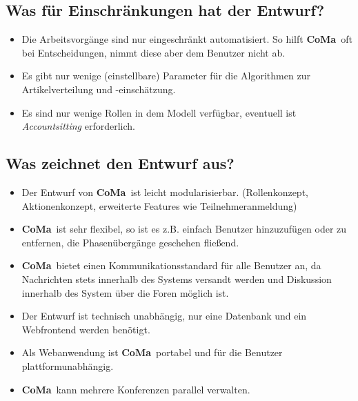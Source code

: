 \documentclass[headexclude,footexclude,12pt,BCOR0pt,DIV15]{scrartcl}
\newcommand{\CoMa}{\textbf{CoMa}}
\begin{document}
    \subsection{Was f\"{u}r Einschr\"{a}nkungen hat der Entwurf?}
    \begin{itemize}
        \item Die Arbeitsvorg\"{a}nge sind nur eingeschr\"{a}nkt automatisiert. So hilft \CoMa\ oft bei Entscheidungen,
            nimmt diese aber dem Benutzer nicht ab.

        \item Es gibt nur wenige (einstellbare) Parameter f\"{u}r die Algorithmen zur Artikelverteilung und -einsch\"{a}tzung.

        \item Es sind nur wenige Rollen in dem Modell verf\"{u}gbar, eventuell ist \emph{Accountsitting} erforderlich.
    \end{itemize}

    \subsection{Was zeichnet den Entwurf aus?}
    \begin{itemize}
        \item Der Entwurf von \CoMa\ ist leicht modularisierbar. (Rollenkonzept, Aktionenkonzept, erweiterte Features wie Teilnehmeranmeldung)

        \item \CoMa\ ist sehr flexibel, so ist es z.B. einfach Benutzer hinzuzuf\"{u}gen oder zu entfernen, die Phasen\"{u}berg\"{a}nge geschehen flie{\ss}end.

        \item \CoMa\ bietet einen Kommunikationsstandard f\"{u}r alle Benutzer an, da Nachrichten stets innerhalb des Systems versandt werden
              und Diskussion innerhalb des System \"{u}ber die Foren m\"{o}glich ist.

        \item Der Entwurf ist technisch unabh\"{a}ngig, nur eine Datenbank und ein Webfrontend werden ben\"{o}tigt.

        \item Als Webanwendung ist \CoMa\ portabel und f\"{u}r die Benutzer plattformunabh\"{a}ngig.

        \item \CoMa\ kann mehrere Konferenzen parallel verwalten.
    \end{itemize}
\end{document}
